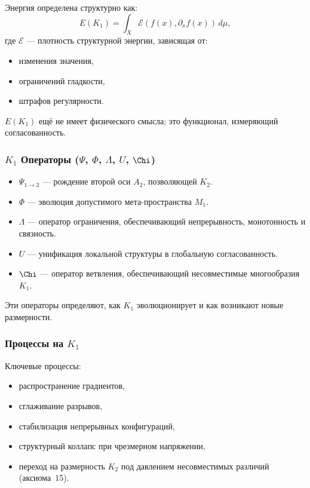 Энергия определена структурно как:
\[
E(K_1) = \int_X \mathcal{E}(f(x), \partial_x f(x))\, d\mu,
\]
где $\mathcal{E}$ — плотность структурной энергии, зависящая от:
\begin{itemize}
    \item изменения значения,
    \item ограничений гладкости,
    \item штрафов регулярности.
\end{itemize}

$E(K_1)$ ещё не имеет физического смысла; это функционал, измеряющий
согласованность.

\subsubsection{\texorpdfstring{$K_1$}{K_1} Операторы (\texorpdfstring{$\Psi$}{\Psi}, \texorpdfstring{$\Phi$}{\Phi}, \texorpdfstring{$\Lambda$}{\Lambda}, \texorpdfstring{$U$}{U}, \texorpdfstring{$\Chi$}{\Chi})}

\begin{itemize}
    \item $\Psi_{1\to2}$ — рождение второй оси $A_2$, позволяющей
          $K_2$.
    \item $\Phi$ — эволюция допустимого мета-пространства $M_1$.
    \item $\Lambda$ — оператор ограничения, обеспечивающий непрерывность,
          монотонность и связность.
    \item $U$ — унификация локальной структуры в глобальную согласованность.
    \item $\Chi$ — оператор ветвления, обеспечивающий несовместимые
          многообразия $K_1$.
\end{itemize}

Эти операторы определяют, как $K_1$ эволюционирует и как возникают новые
размерности.

\subsubsection{Процессы на \texorpdfstring{$K_1$}{K_1}}

Ключевые процессы:
\begin{itemize}
    \item распространение градиентов,
    \item сглаживание разрывов,
    \item стабилизация непрерывных конфигураций,
    \item структурный коллапс при чрезмерном напряжении,
    \item переход на размерность $K_2$ под давлением
          несовместимых различий (аксиома~15).
\end{itemize}

